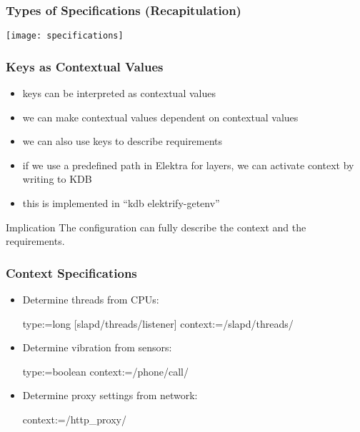 \begin{frame}
	\frametitle{Types of Specifications (Recapitulation)}
	\texttt{[image: specifications]}
\end{frame}

\begin{frame}
	\frametitle{Keys as Contextual Values}

	\begin{itemize}[<+-| alert@+>]
	\item keys can be interpreted as contextual values~\cite{raab2016persistent,raab2017introducing}
	\item we can make contextual values dependent on contextual values
	\item we can also use keys to describe requirements
	\item if we use a predefined path in Elektra for layers, we can activate context by writing to KDB
	\item this is implemented in ``kdb elektrify-getenv''
	\end{itemize}

	\pause[\thebeamerpauses]

	\begin{alertblock}{Implication}
	The configuration can fully describe the context and the requirements.
	\end{alertblock}
\end{frame}

\begin{frame}[fragile]
	\frametitle{Context Specifications}

	\begin{itemize}
	\item
	Determine threads from CPUs:

	\begin{code}
	  type:=long
	[slapd/threads/listener]
	  context:=/slapd/threads/%
	\end{code}

	\item
	Determine vibration from sensors:

	\begin{code}
	  type:=boolean
	  context:=/phone/call/%
	\end{code}

	\item
	Determine proxy settings from network:

	\begin{code}
	  context:=/http_proxy/%
	\end{code}
	\end{itemize}
\end{frame}


